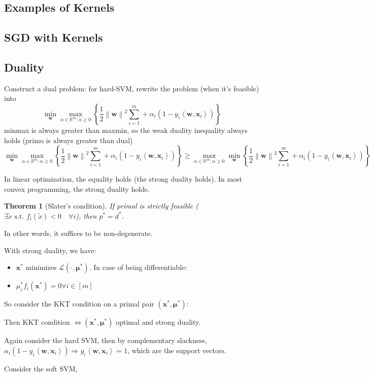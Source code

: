 \documentclass{book}
\newtheorem{Thm}{Theorem}[section]
\begin{document}
\subsection{Examples of Kernels}
\subsection{SGD with Kernels}
\subsection{Duality}
Construct a dual problem: for hard-SVM, rewrite the problem (when it's feasible) into
\begin{equation*}
\min_{\mathbf{w}}\max_{\alpha\in \mathbb{R}^m: \alpha\geq 0}\left\{ \frac{1}{2}\left\|\mathbf{w}\right\|^2 \sum\limits_{i=1}^m +\alpha_i (1- y_i \left\langle \mathbf{w}, \mathbf{x}_i \right\rangle) \right\}
\end{equation*}
minmax is always greater than maxmin, so the weak duality inequality always holds (primo is always greater than dual)
\begin{equation*}
\min_{\mathbf{w}}\max_{\alpha\in \mathbb{R}^m: \alpha\geq 0}\left\{ \frac{1}{2}\left\|\mathbf{w}\right\|^2 \sum\limits_{i=1}^m +\alpha_i (1- y_i \left\langle \mathbf{w}, \mathbf{x}_i \right\rangle) \right\}\geq \max_{\alpha\in \mathbb{R}^m: \alpha\geq 0}\min_{\mathbf{w}}\left\{ \frac{1}{2}\left\|\mathbf{w}\right\|^2 \sum\limits_{i=1}^m +\alpha_i (1- y_i \left\langle \mathbf{w}, \mathbf{x}_i \right\rangle) \right\}
\end{equation*}

In linear optimization, the equality holds (the strong duality holds). In most convex programming, the strong duality holds.

\begin{Thm}[Slater's condition]
  If primal is strictly feasible ($\exists \tilde{x} \text{ s.t. } f_i(\tilde{x})<0 \quad \forall i$), then $p^{*}=d^{*}$.
\end{Thm}
In other words, it suffices to be non-degenerate.

With strong duality, we have:

\begin{itemize}
\item[Stationary condition] $\mathbf{x}^{*}$ minimizes $\mathcal{L}(\cdot, \mathbf{\mu}^{*})$. In case of being differentiable: 
\item[complementary slackness condition] $ \mu_i^{*} f_i(\mathbf{x}^{*})=0 \forall i\in [m]$
\end{itemize}

So consider the KKT condition on a primal pair $(\mathbf{x}^{*}, \mathbf{\mu}^{*})$:

Then KKT condition $\Leftrightarrow (\mathbf{x}^{*}, \mathbf{\mu}^{*})$ optimal and strong duality.

Again consider the hard SVM, then by complementary slackness, $\alpha_i(1-y_i \left\langle \mathbf{w}, \mathbf{x}_i \right\rangle)\Rightarrow y_i \left\langle \mathbf{w}, \mathbf{x}_i \right\rangle=1$, which are the support vectors.

Consider the soft SVM, 
\end{document}
